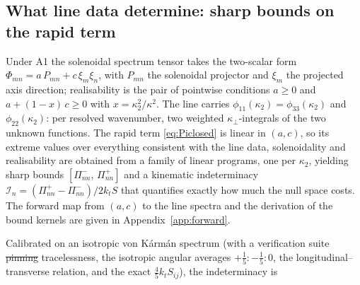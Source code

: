 \documentclass[lineno]{JFM-FLM_Au}
\providecommand{\DIFadd}[1]{{\protect\color{blue}\uwave{#1}}} %
\providecommand{\DIFdel}[1]{{\protect\color{red}\sout{#1}}} %
\providecommand{\DIFaddbegin}{} %
\providecommand{\DIFaddend}{} %
\providecommand{\DIFdelbegin}{} %
\providecommand{\DIFdelend}{} %
\begin{document}
\subsection{What line data determine: sharp bounds on the rapid term}
\label{sec:bounds}

Under A1 the solenoidal spectrum tensor takes the two-scalar form
$\Phi_{mn}=a\,P_{mn}+c\,\xi_m\xi_n$, with $P_{mn}$ the solenoidal projector
and $\xi_m$ the projected axis direction; realisability is the pair of
pointwise conditions $a\ge0$ and $a+(1-x)\,c\ge0$ with
$x=\kappa_2^2/\kappa^2$. The line carries $\phi_{11}(\kappa_2)
=\phi_{33}(\kappa_2)$ and $\phi_{22}(\kappa_2)$: per resolved wavenumber,
two weighted $\kappa_\perp$-integrals of the two unknown functions. The
rapid term \eqref{eq:Piclosed} is linear in $(a,c)$, so its extreme values
over everything consistent with the line data, solenoidality and
realisability are obtained from a family of linear programs, one per
$\kappa_2$, yielding sharp bounds
$[\Pi^{-}_{nn},\,\Pi^{+}_{nn}]$ and a kinematic indeterminacy
$\mathcal I_n=(\Pi^{+}_{nn}-\Pi^{-}_{nn})/2k_tS$ that quantifies exactly
how much the null space costs. The forward map from $(a,c)$ to the line
spectra and the derivation of the bound kernels are given in
Appendix~\ref{app:forward}.

Calibrated on an isotropic von K\'arm\'an spectrum (with a verification
suite \DIFdelbegin \DIFdel{pinning }\DIFdelend \DIFaddbegin \DIFadd{confirming }\DIFaddend tracelessness, the isotropic angular averages
$+\tfrac15:-\tfrac15:0$, the longitudinal--transverse relation, and the
exact $\tfrac45 k_t S_{ij}$), the indeterminacy is
\DIFdelbegin %
\DIFdelend \DIFaddbegin 
\end{document}

